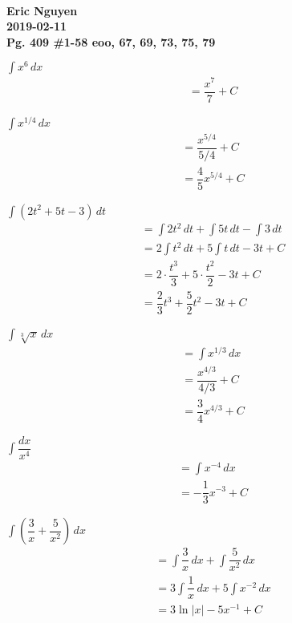 \documentclass[12pt]{article}
\newenvironment{problem}[2][]{
    \begin{trivlist}
        \item[
            {\bfseries #1}
            {\bfseries #2.}
        ]
}{\end{trivlist}}
\newcommand{\assignment}{Pg. 409 \#1-58 eoo, 67, 69, 73, 75, 79}
\newcommand{\name}{Eric Nguyen}
\newcommand{\duedate}{2019-02-11}
\newcommand{\details}{\textbf{\\\name \\\duedate \\\assignment}}
\begin{document}
\details

\begin{problem}{1}
$\displaystyle\int x^6 \, dx$
\begin{align}
&= \dfrac{x^7}{7} + C
\end{align}
\end{problem}

\begin{problem}{5}
$\displaystyle\int x^{1/4} \, dx$
\begin{align}
&= \dfrac{x^{5/4}}{5/4} + C \\
&= \dfrac{4}{5} x^{5/4} + C
\end{align}
\end{problem}

\begin{problem}{9}
$\displaystyle\int (2t^2 + 5t - 3) \, dt$
\begin{align}
&= \int 2t^2 \, dt + \int 5t \, dt - \int 3 \, dt \\ 
&= 2 \int t^2 \, dt + 5 \int t \, dt - 3t + C \\
&= 2 \cdot \dfrac{t^3}{3} + 5 \cdot \dfrac{t^2}{2} - 3t + C \\
&= \dfrac{2}{3}t^3 + \dfrac{5}{2}t^2 - 3t + C
\end{align}
\end{problem}

\begin{problem}{13}
$\displaystyle\int \sqrt[\scriptstyle 3]{x} \, dx$
\begin{align}
&= \int x^{1/3} \, dx \\
&= \dfrac{x^{4/3}}{4/3} + C \\
&= \dfrac{3}{4} x^{4/3} + C
\end{align}
\end{problem}

\begin{problem}{17}
$\displaystyle\int \dfrac{dx}{x^4}$
\begin{align}
&=  \int x^{-4} \, dx \\
&=  -\dfrac{1}{3} x^{-3} + C
\end{align}
\end{problem}

\begin{problem}{21}
$\displaystyle\int \left(\dfrac{3}{x} + \dfrac{5}{x^2}\right) \, dx$
\begin{align}
&= \int \dfrac{3}{x} \, dx + \int \dfrac{5}{x^2} \, dx \\
&= 3 \int \dfrac{1}{x} \, dx + 5 \int x^{-2} \, dx \\
&= 3 \ln{\left|x\right|} - 5x^{-1} + C
\end{align}
\end{problem}
\end{document}
